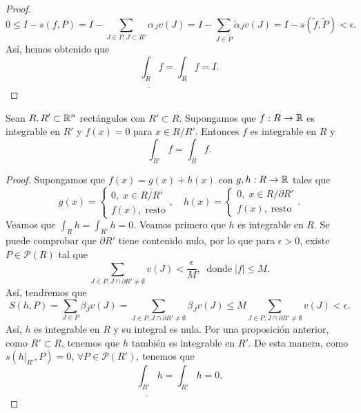\begin{proof}
\[0 \leq I - s\left(f,P\right) = I - \sum_{J \in P, J \subset R'}\alpha_{J}v\left(J\right) = I - \sum_{J \in \tilde{P}}\tilde{\alpha}_{J}v\left(J\right) =  I - s\left(\tilde{f}, \tilde{P}\right) < \epsilon .\]
Así, hemos obtenido que 
\[\underline{\int _{R}}f = \int _{R}f = I .\]
\end{proof}

\begin{prop}
Sean $\displaystyle R, R' \subset \mathbb{R}^{n} $ rectángulos con $\displaystyle R' \subset R $. Supongamos que $\displaystyle f : R \to \mathbb{R} $ es integrable en $\displaystyle R' $ y $\displaystyle f\left(x\right) = 0 $ para $\displaystyle x \in R/R' $. Entonces $\displaystyle f $ es integrable en $\displaystyle R $ y 
\[\int _{R'}f =\int _{R}f .\]
\end{prop}
\begin{proof}
Supongamos que $\displaystyle f\left(x\right)=g\left(x\right) + h\left(x\right) $ con $\displaystyle g, h : R \to \mathbb{R} $ tales que
\[
	g\left(x\right)=
\begin{cases}
0, \; x \in \overline{R/R'} \\
f\left(x\right), \; \text{resto}
\end{cases}
, \quad h\left(x\right) = 
\begin{cases}
0, \; x \in R/\partial R' \\
f\left(x\right), \; \text{resto}
\end{cases}
.\]
Veamos que $\displaystyle \int _{R}h =\int _{R'}h =0 $. Veamos primero que $\displaystyle h $ es integrable en $\displaystyle R $. Se puede comprobar que $\displaystyle \partial R' $ tiene contenido nulo, por lo que para $\displaystyle \epsilon > 0 $, existe $\displaystyle P \in \mathcal{P}\left(R\right) $ tal que 
\[\sum_{J \in P, J \cap \partial R' \neq \emptyset}v\left(J\right) < \frac{\epsilon }{M}, \; \; \text{donde}\; \left|f\right| \leq M .\]
Así, tendremos que 
\[S\left(h, P\right) = \sum_{J \in P}\beta_{J}v\left(J\right) = \sum_{J \in P, J \cap \partial R' \neq \emptyset} \beta_{J}v\left(J\right) \leq M\sum_{J \in P, J \cap \partial R' \neq \emptyset}v\left(J\right) < \epsilon .\]
Así, $\displaystyle h $ es integrable en $\displaystyle R $ y su integral es nula. Por una proposición anterior, como $\displaystyle R' \subset R $, tenemos que $\displaystyle h $ también es integrable en $\displaystyle R' $. De esta manera, como $\displaystyle s\left(h|_{R'}, P\right) = 0 $, $\displaystyle \forall P \in \mathcal{P}\left(R'\right) $, tenemos que 
\[\underline{\int _{R'} }h = \int _{R'}h = 0 .\]

\end{proof}
